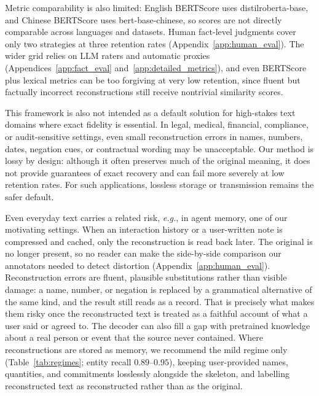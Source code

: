 \documentclass[11pt]{article}
\begin{document}
Metric comparability is also limited: English BERTScore uses distilroberta-base, and Chinese
BERTScore uses bert-base-chinese, so scores are not directly
comparable across languages and datasets. Human fact-level judgments cover only two strategies at three
retention rates (Appendix~\ref{app:human_eval}). The wider grid relies on LLM raters and automatic proxies
(Appendices~\ref{app:fact_eval} and~\ref{app:detailed_metrics}), and even BERTScore plus lexical metrics
can be too forgiving at very low retention, since fluent but factually incorrect reconstructions still
receive nontrivial similarity scores.

This framework is also not intended as a default solution for high-stakes text domains
where exact fidelity is essential. In legal, medical, financial, compliance, or audit-sensitive
settings, even small reconstruction errors in names, numbers, dates, negation cues, or contractual
wording may be unacceptable. Our method is lossy by design: although it often preserves much of the
original meaning, it does not provide guarantees of exact recovery and can fail more severely at low
retention rates. For such applications, lossless storage or transmission remains the safer default.

Even everyday text carries a related risk, {\em e.g.}, in agent memory, one of our motivating settings. When an interaction history or a
user-written note is compressed and cached, only the reconstruction is read back later. The original is no longer present, so no reader can make the side-by-side comparison our annotators needed to detect
distortion (Appendix~\ref{app:human_eval}). Reconstruction errors are fluent, plausible substitutions
rather than visible damage: a name, number, or negation is replaced by a grammatical alternative of the
same kind, and the result still reads as a record. That is precisely what makes them risky once the
reconstructed text is treated as a faithful account of what a user said or agreed to. The decoder can also
fill a gap with pretrained knowledge about a real person or event that the source never contained. Where
reconstructions are stored as memory, we recommend the mild regime only (Table~\ref{tab:regimes}; entity
recall $0.89$--$0.95$), keeping user-provided names, quantities, and commitments losslessly alongside the
skeleton, and labelling reconstructed text as reconstructed rather than as the original.
\end{document}
